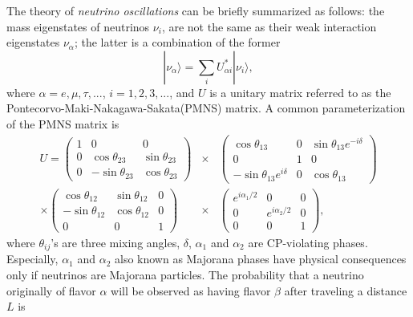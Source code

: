 The theory of \emph{neutrino oscillations} can be briefly summarized as follows: the mass eigenstates of neutrinos $\nu_{i}$, are not the same as their weak interaction eigenstates $\nu_{\alpha}$; the latter is a combination of the former
\begin{equation}
  \label{eq:osci}
  |\nu_{\alpha}\rangle=\sum_{i}U^{*}_{\alpha i}|\nu_{i}\rangle,
\end{equation}
where $\alpha=e,\mu,\tau, ...$, $i=1,2,3, ...$, and $U$ is a unitary matrix referred to as the Pontecorvo-Maki-Nakagawa-Sakata(PMNS) matrix. A common parameterization of the PMNS matrix is
\begin{equation}
  \label{eq:pmns}
  \begin{array}{rcl}
    U = \left(\begin{array}{ccc}
        1 & 0 & 0 \\ 0 & \cos\theta_{23} & \sin\theta_{23} \\ 0 &         -\sin\theta_{23} & \cos\theta_{23}
      \end{array}\right) &\times&
    \left(\begin{array}{ccc}
        \cos\theta_{13} & 0 & \sin\theta_{13}e^{-i\delta} \\ 
        0 & 1 & 0 \\ -\sin\theta_{13}e^{i\delta} & 0 & \cos\theta_{13}
      \end{array}\right) \\\times
    \left(\begin{array}{ccc}
        \cos\theta_{12} & \sin\theta_{12} & 0 \\ -\sin\theta_{12} &         \cos\theta_{12} & 0 \\ 0 & 0 & 1
      \end{array}\right) &\times&
    \left(\begin{array}{ccc}
        e^{i\alpha_1/2} & 0 & 0 \\ 0 & e^{i\alpha_2/2} & 0 \\ 0 & 0 & 1
      \end{array}\right),
  \end{array}
\end{equation}
where $\theta_{ij}$'s are three mixing angles, $\delta$, $\alpha_1$ and $\alpha_2$ are CP-violating phases. Especially, $\alpha_1$ and $\alpha_2$ also known as Majorana phases have physical consequences only if neutrinos are Majorana particles. The probability that a neutrino originally of flavor $\alpha$ will be observed as having flavor $\beta$ after traveling a distance $L$ is
